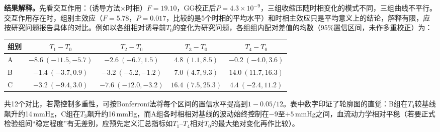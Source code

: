 \begin{center}
\end{center}
\textbf{结果解释。}先看交互作用：（诱导方法$\times$时相）$F=19.10$，GG校正后$P=4.3\times10^{-9}$，三组收缩压随时相变化的模式不同，三组曲线不平行。交互作用存在时，组别主效应（$F=5.78$，$P=0.017$，比较的是5个时相的平均水平）和时相主效应只是平均意义上的结论，解释有限，应按研究问题报告具体的对比。例如以各组相对诱导前$T_0$的变化为研究问题，各组组内配对差值的均数（95\%置信区间，未作多重校正）为：
\begin{center}\small\begin{tabular}{lcccc}
\toprule 组别&$T_1-T_0$&$T_2-T_0$&$T_3-T_0$&$T_4-T_0$\\\midrule
A&$-8.6\ (-11.5,-5.7)$&$-2.6\ (-6.7,1.5)$&$4.8\ (1.1,8.5)$&$-0.2\ (-4.0,3.6)$\\
B&$-1.4\ (-3.7,0.9)$&$-3.2\ (-5.2,-1.2)$&$7.0\ (4.7,9.3)$&$14.0\ (11.7,16.3)$\\
C&$-3.2\ (-9.4,3.0)$&$-7.6\ (-12.0,-3.2)$&$16.4\ (7.5,25.3)$&$4.4\ (-2.4,11.2)$\\\bottomrule
\end{tabular}\end{center}
共12个对比，若需控制多重性，可按Bonferroni法将每个区间的置信水平提高到$1-0.05/12$。表中数字印证了轮廓图的直觉：B组在$T_4$较基线飙升约14\,mmHg，C组在$T_3$飙升约16\,mmHg，而A组各时相相对基线的波动始终控制在$-9$至$+5$\,mmHg之间，血流动力学相对平稳（若要正式检验组间“稳定程度”有无差别，应预先定义汇总指标如$T_1$--$T_4$相对$T_0$的最大绝对变化再作比较）。

